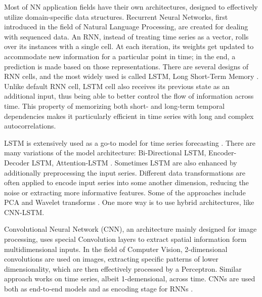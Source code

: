 \documentclass[review, authoryear]{elsarticle}
\begin{document}
Most of NN application fields have their own architectures, designed to effectively utilize domain-specific data structures. Recurrent Neural Networks, first introduced in the field of Natural Language Processing, are created for dealing with sequenced data. An RNN, instead of treating time series as a vector, rolls over its instances with a single cell. At each iteration, its weights get updated to accommodate new information for a particular point in time; in the end, a prediction is made based on those representations.
There are several designs of RNN cells, and the most widely used is called LSTM, Long Short-Term Memory \citep{greff_lstm_2017}. Unlike default RNN cell, LSTM cell also receives its previous state as an additional input, thus being able to better control the flow of information across time. This property of memorizing both short- and long-term temporal dependencies makes it particularly efficient in time series with long and complex autocorrelations.

LSTM is extensively used as a go-to model for time series forecasting \citep{fischer_deep_2018}. There are many variations of the model architecture: Bi-Directional LSTM, Encoder-Decoder LSTM, Attention-LSTM \citep{chen_exploring_2019, istiake_sunny_deep_2020}.
Sometimes LSTM are also enhanced by additionally preprocessing the input series. Different data transformations are often applied to encode input series into some another dimension, reducing the noise or extracting more informative features. Some of the approaches include PCA \citep{ma_stock_2019, gao_improving_2018} and Wavelet transforms \citep{liang_lstm_2019, yan_financial_2018}. One more way is to use hybrid architectures, like CNN-LSTM.

Convolutional Neural Network (CNN), an architecture mainly designed for image processing, uses special Convolution layers to extract spatial information form multidimensional inputs. In the field of Computer Vision, 2-dimensional convolutions are used on images, extracting specific patterns of lower dimensionality, which are then effectively processed by a Perceptron. Similar approach works on time series, albeit 1-demensional, across time. CNNs are used both as end-to-end models and as encoding stage for RNNs \citep{gunduz_intraday_2017,mehtab_stock_2021,hoseinzade_cnnpred_2018,lu_cnn-lstm-based_2020,livieris_cnnlstm_2020}.

\end{document}
